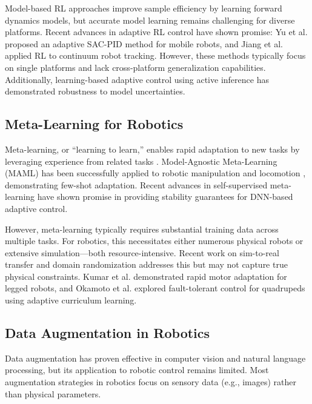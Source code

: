 \documentclass[a4paper]{cas-sc}
\begin{document}
Model-based RL approaches \cite{nagabandi2018neural} improve sample efficiency by learning forward dynamics models, but accurate model learning remains challenging for diverse platforms. Recent advances in adaptive RL control have shown promise: Yu et al. \cite{yu2021adaptive} proposed an adaptive SAC-PID method for mobile robots, and Jiang et al. \cite{jiang2022rl} applied RL to continuum robot tracking. However, these methods typically focus on single platforms and lack cross-platform generalization capabilities. Additionally, learning-based adaptive control using active inference \cite{pezzato2020active} has demonstrated robustness to model uncertainties.

\subsection{Meta-Learning for Robotics}

Meta-learning, or ``learning to learn,'' enables rapid adaptation to new tasks by leveraging experience from related tasks \cite{hospedales2021meta}. Model-Agnostic Meta-Learning (MAML) \cite{finn2017model} has been successfully applied to robotic manipulation \cite{finn2017one} and locomotion \cite{yu2020meta}, demonstrating few-shot adaptation. Recent advances in self-supervised meta-learning \cite{he2024self} have shown promise in providing stability guarantees for DNN-based adaptive control.

However, meta-learning typically requires substantial training data across multiple tasks. For robotics, this necessitates either numerous physical robots or extensive simulation—both resource-intensive. Recent work on sim-to-real transfer \cite{tobin2017domain} and domain randomization \cite{peng2018sim} addresses this but may not capture true physical constraints. Kumar et al. \cite{kumar2021rma} demonstrated rapid motor adaptation for legged robots, and Okamoto et al. \cite{okamoto2021robust} explored fault-tolerant control for quadrupeds using adaptive curriculum learning.

\subsection{Data Augmentation in Robotics}

Data augmentation has proven effective in computer vision \cite{shorten2019survey} and natural language processing, but its application to robotic control remains limited. Most augmentation strategies in robotics focus on sensory data (e.g., images) rather than physical parameters.
\end{document}
